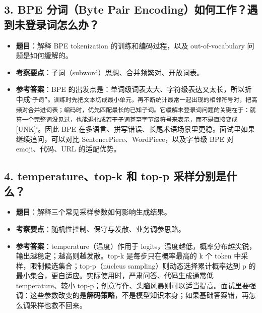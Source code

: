 \subsection{3. BPE 分词（Byte Pair Encoding）如何工作？遇到未登录词怎么办？}
\begin{itemize}[leftmargin=2em]
\item \textbf{题目}：解释 BPE tokenization 的训练和编码过程，以及 out-of-vocabulary 问题是如何缓解的。
\item \textbf{考察要点}：子词（subword）思想、合并频繁对、开放词表。
\item \textbf{参考答案}：BPE 的出发点是：单词级词表太大、字符级表达又太长，所以折中成`\texttt{子词''。训练时先把文本切成最小单元，再不断统计最常一起出现的相邻符号对，把高频对合并进词表；编码时，优先匹配最长的已知子词。它缓解未登录词问题的关键在于：就算一个完整词没见过，也能退化成若干子词甚至字节级符号来表示，而不是直接变成 }[UNK]`。因此 BPE 在多语言、拼写错误、长尾术语场景里更稳。面试里如果继续追问，可以对比 SentencePiece、WordPiece，以及字节级 BPE 对 emoji、代码、URL 的适配优势。
\end{itemize}

\subsection{4. temperature、top-k 和 top-p 采样分别是什么？}
\begin{itemize}[leftmargin=2em]
\item \textbf{题目}：解释三个常见采样参数如何影响生成结果。
\item \textbf{考察要点}：随机性控制、保守与发散、业务调参思路。
\item \textbf{参考答案}：temperature（温度）作用于 logits，温度越低，概率分布越尖锐，输出越稳定；越高则越发散。top-k 是每步只在概率最高的 k 个 token 中采样，限制候选集合；top-p（nucleus sampling）则动态选择累计概率达到 p 的最小集合，更自适应。实际使用时，严肃问答、代码生成通常低 temperature、较小 top-p；创意写作、头脑风暴则可以适当提高。面试里要强调：这些参数改变的是\textbf{解码策略}，不是模型知识本身；如果基础答案错，再怎么调采样也救不回来。
\end{itemize}

